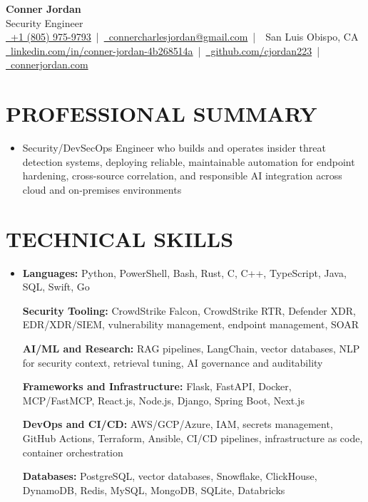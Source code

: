 \documentclass[letterpaper,10pt]{article}
\newcommand{\resumeSubHeadingListStart}{\begin{itemize}[leftmargin=0in,label={}]}
\newcommand{\resumeSubHeadingListEnd}{\end{itemize}}
\begin{document}
\begin{center}
  {\Huge \textbf{Conner Jordan}}\\[0pt]
  {\Large Security Engineer}\\[0pt]
  \href{tel:+18059759793}{\faPhone\ +1 (805) 975-9793} \,|\, 
  \href{mailto:connercharlesjordan@gmail.com}{\faEnvelope\ connercharlesjordan@gmail.com} \,|\, 
  \faMapMarker\ San Luis Obispo, CA \\[-2pt]
  \href{https://www.linkedin.com/in/conner-jordan-4b268514a/}{\faLinkedin\ linkedin.com/in/conner-jordan-4b268514a}
  \,|\, \href{https://github.com/cjordan223}{\faGithub\ github.com/cjordan223}
  \,|\, \href{https://connerjordan.com/}{\faGlobe\ connerjordan.com}
\end{center}

\vspace{4pt}

\section{PROFESSIONAL SUMMARY}
\vspace{8pt}
\resumeSubHeadingListStart
\item {\small
Security/DevSecOps Engineer who builds and operates insider threat detection systems, deploying reliable, maintainable automation for endpoint hardening, cross-source correlation, and responsible AI integration across cloud and on-premises environments}
\resumeSubHeadingListEnd
\vspace{6pt}

\section{TECHNICAL SKILLS}
\vspace{6pt}
\resumeSubHeadingListStart
\item {\small
\textbf{Languages:} Python, PowerShell, Bash, Rust, C, C++, TypeScript, Java, SQL, Swift, Go

\vspace{3pt}
\textbf{Security Tooling:} CrowdStrike Falcon, CrowdStrike RTR, Defender XDR, EDR/XDR/SIEM, vulnerability management, endpoint management, SOAR

\vspace{3pt}
\textbf{AI/ML and Research:} RAG pipelines, LangChain, vector databases, NLP for security context, retrieval tuning, AI governance and auditability

\vspace{3pt}
\textbf{Frameworks and Infrastructure:} Flask, FastAPI, Docker, MCP/FastMCP, React.js, Node.js, Django, Spring Boot, Next.js

\vspace{3pt}
\textbf{DevOps and CI/CD:} AWS/GCP/Azure, IAM, secrets management, GitHub Actions, Terraform, Ansible, CI/CD pipelines, infrastructure as code, container orchestration

\vspace{3pt}
\textbf{Databases:} PostgreSQL, vector databases, Snowflake, ClickHouse, DynamoDB, Redis, MySQL, MongoDB, SQLite, Databricks
}
\resumeSubHeadingListEnd
\vspace{6pt}
\end{document}
